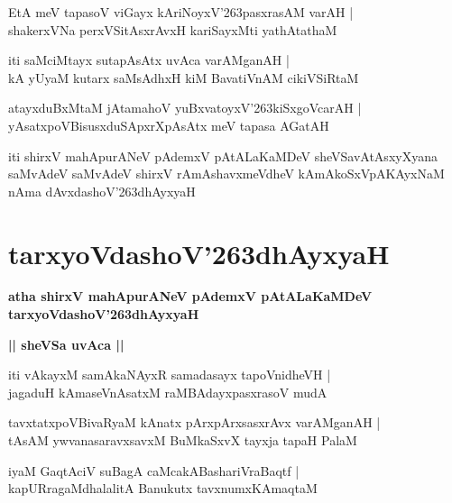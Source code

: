 \documentclass[twoside,12pt,openright]{book}
\def\S{\char'263}
\newcounter{shloka}[chapter]
\def\uvaca#1{\centerline{{\large\textbf{#1}}}}
\begin{document}
\begin{shloka}%
EtA meV tapasoV viGayx kAriNoyxV\S pasxrasAM varAH |\\
shakerxVNa perxVSitAsxrAvxH kariSayxMti yathAtathaM 
\end{shloka}

\begin{shloka}%
iti saMciMtayx sutapAsAtx uvAca varAMganAH |\\
kA yUyaM kutarx saMsAdhxH kiM BavatiVnAM cikiVSiRtaM  
\end{shloka}

\begin{shloka}%
atayxduBxMtaM jAtamahoV yuBxvatoyxV\S kiSxgoVcarAH |\\
yAsatxpoVBisusxduSApxrXpAsAtx meV tapasa AGatAH 
\end{shloka}

\begin{center}
iti shirxV mahApurANeV pAdemxV pAtALaKaMDeV sheVSavAtAsxyXyana saMvAdeV 
saMvAdeV shirxV rAmAshavxmeVdheV kAmAkoSxVpAKAyxNaM nAma dAvxdashoV\S dhAyxyaH
\end{center}

\chapter{tarxyoVdashoV\S dhAyxyaH}

\begin{center}
{\LARGE\bfseries atha shirxV mahApurANeV pAdemxV pAtALaKaMDeV tarxyoVdashoV\S dhAyxyaH}
\end{center}

\uvaca{|| sheVSa uvAca ||}

\begin{shloka}%
iti vAkayxM samAkaNAyxR samadasayx tapoVnidheVH |\\
jagaduH kAmaseVnAsatxM raMBAdayxpasxrasoV mudA 
\end{shloka}

\begin{shloka}%
tavxtatxpoVBivaRyaM kAnatx pArxpArxsasxrAvx varAMganAH |\\
tAsAM ywvanasaravxsavxM BuMkaSxvX tayxja tapaH PalaM
\end{shloka}

\begin{shloka}%
iyaM GaqtAciV suBagA caMcakABashariVraBaqtf |\\
kapURragaMdhalalitA Banukutx tavxnumxKAmaqtaM 
\end{shloka}
\end{document}
